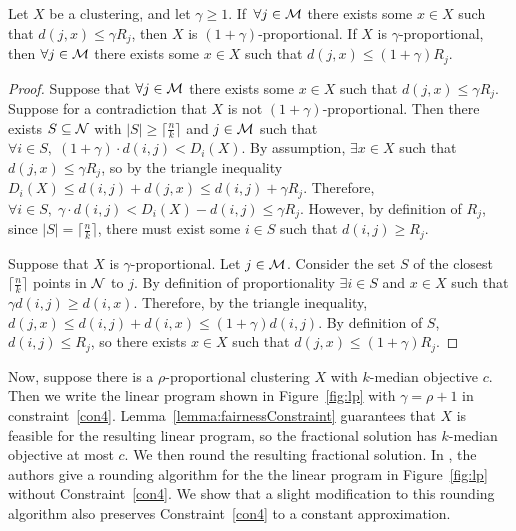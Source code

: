 \begin{lemma}
\label{lemma:fairnessConstraint}
	Let $X$ be a clustering, and let $\gamma \geq 1$. If \,$\forall j \in \mathcal{M}$ there exists some $x \in X$ such that $d(j, x) \leq \gamma R_j$, then $X$ is $(1+\gamma)$-proportional. If $X$ is $\gamma$-proportional, then $\forall j \in \mathcal{M}$ there exists some $x \in X$ such that $d(j, x) \leq (1+\gamma) R_j$.
\end{lemma}
\begin{proof}
	Suppose that $\forall j \in \mathcal{M}$ there exists some $x \in X$ such that $d(j, x) \leq \gamma R_j$. Suppose for a contradiction that $X$ is not $(1+\gamma)$-proportional. Then there exists $S \subseteq \mathcal {N}$ with $|S| \geq \lceil \frac{n}{k} \rceil$ and $j \in \mathcal{M}$ such that $\forall i \in S, \; (1+\gamma) \cdot d(i, j) < D_i(X)$. By assumption, $\exists x \in X$ such that $d(j, x) \leq \gamma R_j$, so by the triangle inequality $D_i(X) \leq d(i, j) + d(j, x) \leq d(i, j) + \gamma R_j$. Therefore, $\forall i \in S, \; \gamma \cdot d(i, j) < D_i(X) - d(i, j) \leq \gamma R_j$. However, by definition of $R_j$, since $|S| = \lceil \frac{n}{k} \rceil$, there must exist some $i \in S$ such that $d(i, j) \geq R_j$.
	
	Suppose that $X$ is $\gamma$-proportional. Let $j \in \mathcal{M}$. Consider the set $S$ of the closest $\lceil \frac{n}{k} \rceil$ points in $\mathcal {N}$ to $j$. By definition of proportionality $\exists i \in S$ and $x \in X$ such that $\gamma d(i, j) \geq d(i, x)$. Therefore, by the triangle inequality, $d(j, x) \leq d(i, j) + d(i, x) \leq (1+\gamma) d(i, j)$. By definition of $S$, $d(i, j) \leq R_j$, so there exists $x \in X$ such that $d(j, x) \leq (1+\gamma) R_j$.  
\end{proof}

Now, suppose there is a $\rho$-proportional clustering $X$ with $k$-median objective $c$. Then we write the linear program shown in Figure~\ref{fig:lp} with $\gamma = \rho+1$ in constraint~\ref{con4}. Lemma~\ref{lemma:fairnessConstraint} guarantees that $X$ is feasible for the resulting linear program, so the fractional solution has $k$-median objective at most $c$.  We then round the resulting fractional solution. In \cite{kMedianLP}, the authors give a rounding algorithm for the the linear program in Figure~\ref{fig:lp} without Constraint~\ref{con4}. %
We show that a slight modification to this rounding algorithm also %
preserves Constraint~\ref{con4} to a constant approximation.

